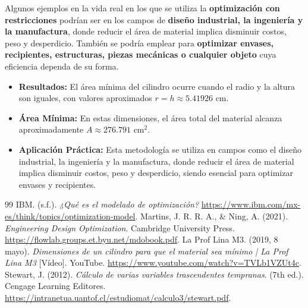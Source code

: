 \documentclass[12pt]{article}  %
\begin{document}
Algunos ejemplos en la vida real en los que se utiliza la \textbf{optimización con restricciones} podrían ser en los campos de \textbf{diseño industrial, la ingeniería y la manufactura}, donde reducir el área de material implica disminuir costos, peso y desperdicio. También se podría emplear para \textbf{optimizar envases, recipientes, estructuras, piezas mecánicas o cualquier objeto} cuya eficiencia dependa de su forma.
\begin{itemize}
 \item \textbf{Resultados:} El área mínima del cilindro ocurre cuando el radio y la altura son iguales, con valores aproximados $r=h \approx 5.41926\text{ cm}$.
 \item \textbf{Área Mínima:} En estas dimensiones, el área total del material alcanza aproximadamente $A \approx 276.791\text{ cm}^{2}$.
 \item \textbf{Aplicación Práctica:} Esta metodología se utiliza en campos como el diseño industrial, la ingeniería y la manufactura, donde reducir el área de material implica disminuir costos, peso y desperdicio, siendo esencial para optimizar envases y recipientes.
\end{itemize}

\begin{thebibliography}{99}
  IBM. (s.f.). \textit{¿Qué es el modelado de optimización?} \url{https://www.ibm.com/mx-es/think/topics/optimization-model}.
  Martins, J. R. R. A., \& Ning, A. (2021). \textit{Engineering Design Optimization}. Cambridge University Press. \url{https://flowlab.groups.et.byu.net/mdobook.pdf}.
  La Prof Lina M3. (2019, 8 mayo). \textit{Dimensiones de un cilindro para que el material sea mínimo | La Prof Lina M3} [Vídeo]. YouTube. \url{https://www.youtube.com/watch?v=TVLb1VZUt4c}.
  Stewart, J. (2012). \textit{Cálculo de varias variables trascendentes tempranas}. (7th ed.). Cengage Learning Editores. \url{https://intranetua.uantof.cl/estudiomat/calculo3/stewart.pdf}.
\end{thebibliography}
\end{document}
